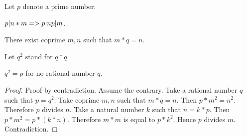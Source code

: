\documentclass{article}
\begin{document}
\begin{forthel}
    Let $p$ denote a prime number.

    \begin{axiom}
      $p | n * m => p | n \/ p | m$.
    \end{axiom}

    \begin{axiom}
      There exist coprime $m,n$ such that $m * q = n$.
    \end{axiom}

    Let $q^{2}$ stand for $q * q$.


    \begin{proposition}
      $q^{2} = p$ for no rational number $q$.
    \end{proposition}
    \begin{proof}
      Proof by contradiction. Assume the contrary. Take a rational number $q$ such that $p = q^{2}$. Take coprime $m,n$ such that $m * q = n$. Then $p * m^{2} = n^{2}$. Therefore $p$ divides $n$. Take a natural number $k$ such that $n = k * p$. Then $p * m^{2} = p * (k * n)$. Therefore $m * m$ is equal to $p * k^{2}$. Hence $p$ divides $m$. Contradiction.
    \end{proof}
  \end{forthel}
\end{document}
